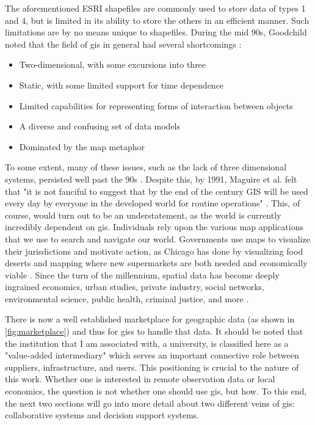 The aforementioned ESRI shapefiles are commonly used to store data of types 1 and 4, but is limited in its ability to store the others in an efficient manner. Such limitations are by no means unique to shapefiles. During the mid 90s, Goodchild noted that the field of \ac{gis} in general had several shortcomings \cite{goodchildGeographicInformationSystems1994}:

\begin{itemize}
    \setlength{\itemsep}{0pt}%
    \setlength{\parskip}{0pt}%
	\item{Two-dimensional, with some excursions into three}
	\item{Static, with some limited support for time dependence}
	\item{Limited capabilities for representing forms of interaction between objects}
	\item{A diverse and confusing set of data models}
	\item{Dominated by the map metaphor}
\end{itemize}

To some extent, many of these issues, such as the lack of three dimensional systems, persisted well past the 90s \cite{goodchildTwentyYearsProgress2010}. Despite this, by 1991, Maguire et al. felt that "it is not fanciful to suggest that by the end of the century GIS will be used every day by everyone in the developed world for routine operations" \cite{maguireGeographicalInformationSystems1991}. This, of course, would turn out to be an understatement, as the world is currently incredibly dependent on \ac{gis}. Individuals rely upon the various map applications that we use to search and navigate our world. Governments use maps to visualize their jurisdictions and motivate action, as Chicago has done by visualizing food deserts and mapping where new supermarkets are both needed and economically viable \cite{goldsmithResponsiveCityEngaging2014}. Since the turn of the millennium, spatial data has become deeply ingrained economics, urban studies, private industry, social networks, environmental science, public health, criminal justice, and more \cite{goodchildSpatiallyIntegratedSocial2000}.

There is now a well established marketplace for geographic data (as shown in \ref{fig:marketplace}) and thus for \acp{gis} to handle that data. It should be noted that the institution that I am associated with, a university, is classified here as a "value-added intermediary" which serves an important connective role between suppliers, infrastructure, and users. This positioning is crucial to the nature of this work. Whether one is interested in remote observation data or local economics, the question is not whether one should use \ac{gis}, but how. To this end, the next two sections will go into more detail about two different veins of \ac{gis}: collaborative systems and decision support systems.

